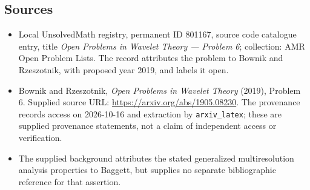 \documentclass[11pt]{article}
\begin{document}
\subsection{Sources}
\begin{itemize}
\item Local UnsolvedMath registry, permanent ID 801167, source code catalogue entry, title \emph{Open Problems in Wavelet Theory --- Problem 6}; collection: AMR Open Problem Lists. The record attributes the problem to Bownik and Rzeszotnik, with proposed year 2019, and labels it open.
\item Bownik and Rzeszotnik, \emph{Open Problems in Wavelet Theory} (2019), Problem 6. Supplied source URL: \url{https://arxiv.org/abs/1905.08230}. The provenance records access on 2026-10-16 and extraction by \texttt{arxiv\_latex}; these are supplied provenance statements, not a claim of independent access or verification.
\item The supplied background attributes the stated generalized multiresolution analysis properties to Baggett, but supplies no separate bibliographic reference for that assertion.
\end{itemize}
\end{document}
